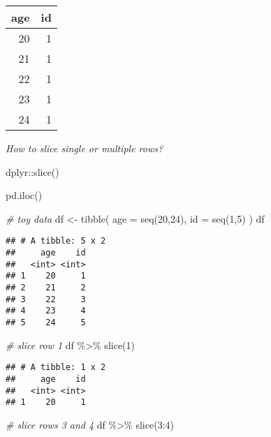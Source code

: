 \documentclass[
]{book}
\newenvironment{Shaded}{\begin{snugshade}}{\end{snugshade}}
\newcommand{\AttributeTok}[1]{\textcolor[rgb]{0.77,0.63,0.00}{#1}}
\newcommand{\CommentTok}[1]{\textcolor[rgb]{0.56,0.35,0.01}{\textit{#1}}}
\newcommand{\DecValTok}[1]{\textcolor[rgb]{0.00,0.00,0.81}{#1}}
\newcommand{\FunctionTok}[1]{\textcolor[rgb]{0.00,0.00,0.00}{#1}}
\newcommand{\NormalTok}[1]{#1}
\newcommand{\OtherTok}[1]{\textcolor[rgb]{0.56,0.35,0.01}{#1}}
\newcommand{\SpecialCharTok}[1]{\textcolor[rgb]{0.00,0.00,0.00}{#1}}
\begin{document}
\begin{longtable}[]{@{}rr@{}}
\toprule
age & id \\
\midrule
\endhead
20 & 1 \\
21 & 1 \\
22 & 1 \\
23 & 1 \\
24 & 1 \\
\bottomrule
\end{longtable}

\emph{How to slice single or multiple rows?}

dplyr::slice()

pd.iloc()

\begin{Shaded}
\begin{Highlighting}[]
\CommentTok{\# toy data}
\NormalTok{df }\OtherTok{\textless{}{-}} \FunctionTok{tibble}\NormalTok{(}
  \AttributeTok{age =} \FunctionTok{seq}\NormalTok{(}\DecValTok{20}\NormalTok{,}\DecValTok{24}\NormalTok{),}
  \AttributeTok{id =} \FunctionTok{seq}\NormalTok{(}\DecValTok{1}\NormalTok{,}\DecValTok{5}\NormalTok{)}
\NormalTok{)}
\NormalTok{df}
\end{Highlighting}
\end{Shaded}

\begin{verbatim}
## # A tibble: 5 x 2
##     age    id
##   <int> <int>
## 1    20     1
## 2    21     2
## 3    22     3
## 4    23     4
## 5    24     5
\end{verbatim}

\begin{Shaded}
\begin{Highlighting}[]
\CommentTok{\# slice row 1}
\NormalTok{df }\SpecialCharTok{\%\textgreater{}\%} \FunctionTok{slice}\NormalTok{(}\DecValTok{1}\NormalTok{)}
\end{Highlighting}
\end{Shaded}

\begin{verbatim}
## # A tibble: 1 x 2
##     age    id
##   <int> <int>
## 1    20     1
\end{verbatim}

\begin{Shaded}
\begin{Highlighting}[]
\CommentTok{\# slice rows 3 and 4}
\NormalTok{df }\SpecialCharTok{\%\textgreater{}\%} \FunctionTok{slice}\NormalTok{(}\DecValTok{3}\SpecialCharTok{:}\DecValTok{4}\NormalTok{)}
\end{Highlighting}
\end{Shaded}
\end{document}
